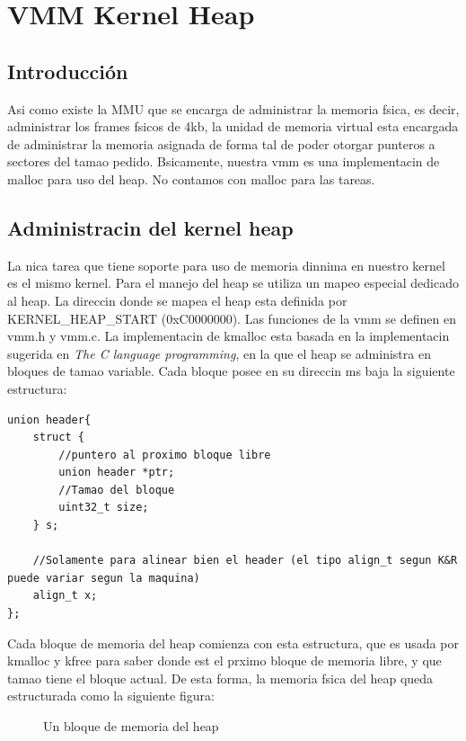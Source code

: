 \section{VMM Kernel Heap}
\subsection{Introducción}
Asi como existe la MMU que se encarga de administrar la memoria fsica, es decir, administrar los frames fsicos de 4kb, la unidad de memoria virtual esta encargada de administrar la memoria asignada 
de forma tal de poder otorgar punteros a sectores del tamao pedido. Bsicamente, nuestra vmm es una implementacin de malloc para uso del heap. No contamos con malloc para las tareas.

\subsection{Administracin del kernel heap}
La nica tarea que tiene soporte para uso de memoria dinnima en nuestro kernel es el mismo kernel. Para el manejo del heap se utiliza un mapeo especial dedicado al heap. La direccin donde se mapea 
el heap esta definida por KERNEL\_HEAP\_START (0xC0000000). Las funciones de la vmm se definen en vmm.h y vmm.c. La implementacin de kmalloc esta basada en la implementacin sugerida en 
\textit{The C language programming}, en la que el heap se administra en bloques de tamao variable. Cada bloque posee en su direccin ms baja la siguiente estructura:

\begin{verbatim}
union header{
    struct {
        //puntero al proximo bloque libre
        union header *ptr;
        //Tamao del bloque
        uint32_t size;       
    } s;
    
    //Solamente para alinear bien el header (el tipo align_t segun K&R puede variar segun la maquina)
    align_t x;
};
\end{verbatim}
Cada bloque de memoria del heap comienza con esta estructura, que es usada por kmalloc y kfree para saber donde est el prximo bloque de memoria 
libre, y que tamao tiene el bloque actual. De esta forma, la memoria fsica del heap queda estructurada como la siguiente figura:

\begin{figure}[H]
\centering
{}
\caption{Un bloque de memoria del heap}
\end{figure}

